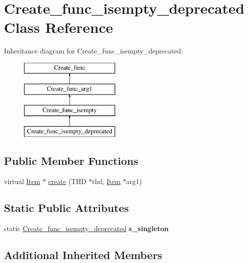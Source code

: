 \hypertarget{classCreate__func__isempty__deprecated}{}\section{Create\+\_\+func\+\_\+isempty\+\_\+deprecated Class Reference}
\label{classCreate__func__isempty__deprecated}
Inheritance diagram for Create\+\_\+func\+\_\+isempty\+\_\+deprecated\+:\begin{figure}[H]
\begin{center}
\leavevmode
\includegraphics[height=4.000000cm]{classCreate__func__isempty__deprecated}
\end{center}
\end{figure}
\subsection*{Public Member Functions}
\begin{DoxyCompactItemize}
\item 
virtual \mbox{\hyperlink{classItem}{Item}} $\ast$ \mbox{\hyperlink{classCreate__func__isempty__deprecated_ac25a3427cf94499607940b1077c37b29}{create}} (T\+HD $\ast$thd, \mbox{\hyperlink{classItem}{Item}} $\ast$arg1)
\end{DoxyCompactItemize}
\subsection*{Static Public Attributes}
\begin{DoxyCompactItemize}
\item 
\mbox{\label{classCreate__func__isempty__deprecated_a67d36dd56cf1572fd624301bb4e83d9d}} 
static \mbox{\hyperlink{classCreate__func__isempty__deprecated}{Create\+\_\+func\+\_\+isempty\+\_\+deprecated}} {\bfseries s\+\_\+singleton}
\end{DoxyCompactItemize}
\subsection*{Additional Inherited Members}


